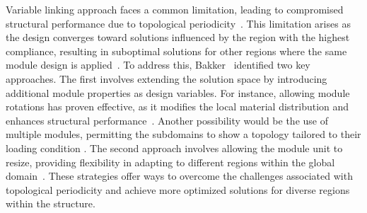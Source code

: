Variable linking approach faces a common limitation, leading to compromised structural performance due to topological periodicity~. This limitation arises as the design converges toward solutions influenced by the region with the highest compliance, resulting in suboptimal solutions for other regions where the same module design is applied~. To address this, Bakker~ identified two key approaches. The first involves extending the solution space by introducing additional module properties as design variables. For instance, allowing module rotations has proven effective, as it modifies the local material distribution and enhances structural performance~. Another possibility would be the use of multiple modules, permitting the subdomains to show a topology tailored to their loading condition . The second approach involves allowing the module unit to resize, providing flexibility in adapting to different regions within the global domain~. These strategies offer ways to overcome the challenges associated with topological periodicity and achieve more optimized solutions for diverse regions within the structure.